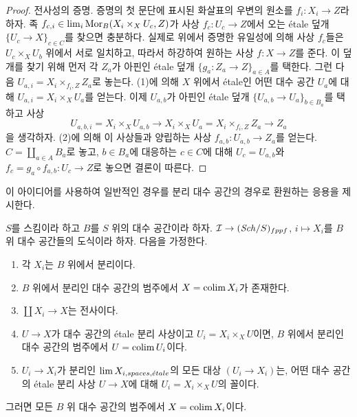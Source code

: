 \begin{proof}
\medskip\noindent
전사성의 증명. 증명의 첫 문단에 표시된 화살표의 우변의 원소를
$f_i : X_i \to Z$라 하자.
족 $f_{c, i} \in \mathop{\mathrm{lim}}\nolimits_i \mathop{\mathrm{Mor}}\nolimits_B(X_i \times_X U_c, Z)$가
사상 $f_c : U_c \to Z$에서 오는 \'etale 덮개
$\{U_c \to X\}_{c \in C}$를 찾으면 충분하다.
실제로 위에서 증명한 유일성에 의해 사상 $f_c$들은
$U_c \times_X U_b$ 위에서 서로 일치하고, 따라서 하강하여
원하는 사상 $f : X \to Z$를 준다.
이 덮개를 찾기 위해 먼저 각 $Z_a$가 아핀인
\'etale 덮개 $\{g_a : Z_a \to Z\}_{a \in A}$를 택한다.
그런 다음 $U_{a, i} = X_i \times_{f_i, Z} Z_a$로 놓는다.
(1)에 의해 $X$ 위에서 \'etale인 어떤 대수 공간 $U_a$에 대해
$U_{a, i} = X_i \times_X U_a$를 얻는다.
이제 $U_{a, b}$가 아핀인 \'etale 덮개
$\{U_{a, b} \to U_a\}_{b \in B_a}$를 택하고 사상
$$
U_{a, b, i} = X_i \times_X U_{a, b} \to
X_i \times_X U_a = X_i \times_{f_i, Z} Z_a \to Z_a
$$
을 생각하자. (2)에 의해 이 사상들과 양립하는 사상
$f_{a, b} : U_{a, b} \to Z_a$를 얻는다.
$C = \coprod_{a \in A} B_a$로 놓고, $b \in B_a$에 대응하는
$c \in C$에 대해 $U_c = U_{a, b}$와
$f_c = g_a \circ f_{a, b} : U_c \to Z$로 놓으면 결론이 따른다.
\end{proof}

\noindent
이 아이디어를 사용하여 일반적인 경우를 분리 대수 공간의 경우로
환원하는 응용을 제시한다.

\begin{lemma}
\label{lemma-colimit-separated-enough}
$S$를 스킴이라 하고 $B$를 $S$ 위의 대수 공간이라 하자.
$\mathcal{I} \to (\mathit{Sch}/S)_{fppf}$, $i \mapsto X_i$를
$B$ 위 대수 공간들의 도식이라 하자. 다음을 가정한다.
\begin{enumerate}
\item 각 $X_i$는 $B$ 위에서 분리이다.
\item $B$ 위에서 분리인 대수 공간의 범주에서
$X = \mathop{\mathrm{colim}}\nolimits X_i$가 존재한다.
\item $\coprod X_i \to X$는 전사이다.
\item $U \to X$가 대수 공간의 \'etale 분리 사상이고
$U_i = X_i \times_X U$이면, $B$ 위에서 분리인 대수 공간의
범주에서 $U = \mathop{\mathrm{colim}}\nolimits U_i$이다.
\item $U_i \to X_i$가 분리인
$\mathop{\mathrm{lim}}\nolimits X_{i, spaces, {\acute{e}tale}}$의 모든 대상 $(U_i \to X_i)$는,
어떤 대수 공간의 \'etale 분리 사상 $U \to X$에 대해
$U_i = X_i \times_X U$의 꼴이다.
\end{enumerate}
그러면 모든 $B$ 위 대수 공간의 범주에서 $X = \mathop{\mathrm{colim}}\nolimits X_i$이다.
\end{lemma}

